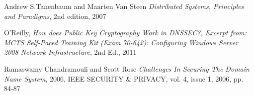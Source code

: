 \begin{thebibliography}{9}

Andrew S.Tanenbaum and Maarten Van Steen 
\emph{Distributed Systems, Principles and Paradigms}, 2nd edition, 2007

O’Reilly, \emph{How does Public Key Cryptography Work in DNSSEC?, Excerpt from: MCTS
Self-Paced Training Kit (Exam 70-642): Configuring Windows Server 2008 Network Infrastructure},
2nd Ed., 2011

Ramaswamy Chandramouli and Scott Rose
\emph{Challenges In Securing The Domain Name System}, 2006, IEEE SECURITY \& PRIVACY, vol. 4, issue 1, 2006, pp. 84-87

\end{thebibliography} 